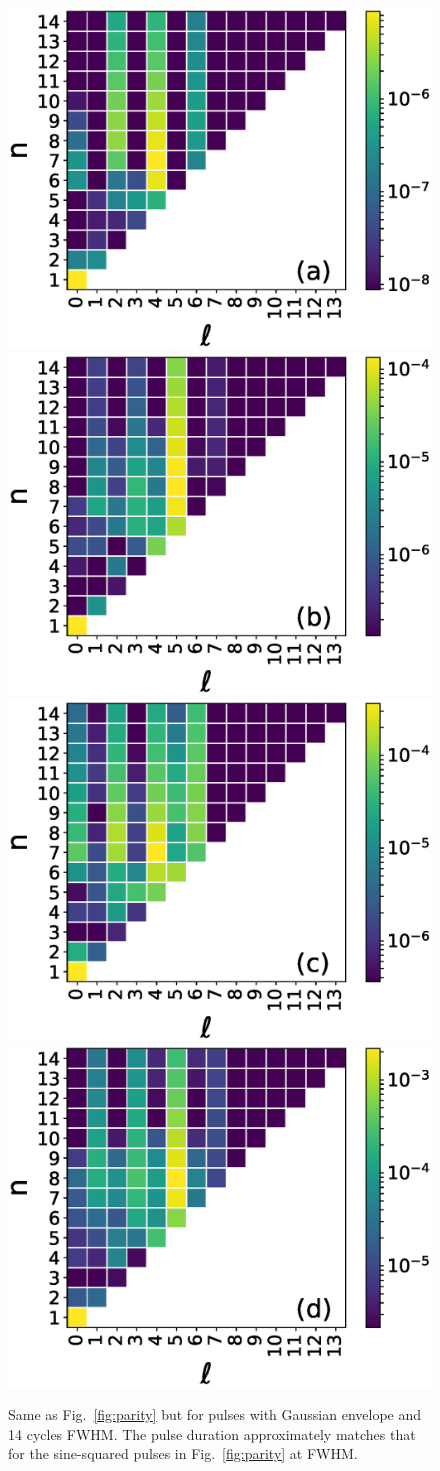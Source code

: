 \begin{figure}[h!]
\centering
\includegraphics[width=0.49\columnwidth]{figs/Rydberg/heat_14_cyc_gauss_3p4e13.eps}
\includegraphics[width=0.49\columnwidth]{figs/Rydberg/heat_14_cyc_gauss_6p0e13.eps}
\includegraphics[width=0.49\columnwidth]{figs/Rydberg/heat_14_cyc_gauss_8p6e13.eps}
\includegraphics[width=0.49\columnwidth]{figs/Rydberg/heat_14_cyc_gauss_11p2e13.eps}
\caption{\label{fig:parity_gauss}
Same as Fig.~\ref{fig:parity} but for pulses with Gaussian envelope and 14 cycles FWHM. The pulse duration approximately matches that for the sine-squared pulses in Fig.~\ref{fig:parity} at FWHM.
}
\end{figure}

